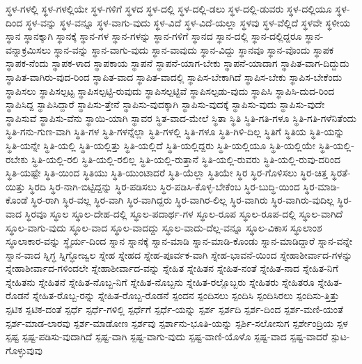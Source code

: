 {ಸ್ಥಳ-ಗಳಲ್ಲಿ
ಸ್ಥಳ-ಗಳಲ್ಲಿಯೇ
ಸ್ಥಳ-ಗಳಿಗೆ
ಸ್ಥಳದ
ಸ್ಥಳ-ದಲ್ಲಿ
ಸ್ಥಳ-ದಲ್ಲಿ-ಡಲು
ಸ್ಥಳ-ದಲ್ಲಿ-ಡುವರು
ಸ್ಥಳ-ದಲ್ಲಿಯೂ
ಸ್ಥಳ-ದಿಂದ
ಸ್ಥಳ-ವನ್ನು
ಸ್ಥಳ-ವನ್ನೂ
ಸ್ಥಳ-ವಾಗು-ವುದು
ಸ್ಥಳ-ವಿದೆ
ಸ್ಥಳ-ವಿದೆ-ಯಲ್ಲಾ
ಸ್ಥಳವು
ಸ್ಥಳ-ವೆಲ್ಲಿದೆ
ಸ್ಥಳವೇ
ಸ್ಥಳೀಯ
ಸ್ಥಾನ
ಸ್ಥಾನಕ್ಕಾಗಿ
ಸ್ಥಾನಕ್ಕೆ
ಸ್ಥಾನ-ಗಳ
ಸ್ಥಾನ-ಗಳನ್ನು
ಸ್ಥಾನ-ಗಳಿಗೆ
ಸ್ಥಾನದ
ಸ್ಥಾನ-ದಲ್ಲಿ
ಸ್ಥಾನ-ದಲ್ಲಿದ್ದರೂ
ಸ್ಥಾನ-ವನ್ನಾಕ್ರಮಿಸಲು
ಸ್ಥಾನ-ವನ್ನು
ಸ್ಥಾನ-ವಾಗು-ವುದು
ಸ್ಥಾನ-ವಾವುದು
ಸ್ಥಾನ-ವಿದ್ದು
ಸ್ಥಾನವೂ
ಸ್ಥಾನ-ವೊಂದು
ಸ್ಥಾಪಕ
ಸ್ಥಾಪಕ-ನೆಂದು
ಸ್ಥಾಪಕ-ಳಾದ
ಸ್ಥಾಪಕಾಯ
ಸ್ಥಾಪನೆ
ಸ್ಥಾಪನೆ-ಯಾಗ-ಬೇಕು
ಸ್ಥಾಪನೆ-ಯಾದಾಗ
ಸ್ಥಾಪಿತ-ವಾಗ-ದಿದ್ದುದು
ಸ್ಥಾಪಿತ-ವಾಗಿರು-ವುದ-ರಿಂದ
ಸ್ಥಾಪಿತ-ವಾದ
ಸ್ಥಾಪಿತ-ವಾದಲ್ಲಿ
ಸ್ಥಾಪಿಸ-ಬೇಕಾಗಿದೆ
ಸ್ಥಾಪಿಸ-ಬೇಕು
ಸ್ಥಾಪಿಸ-ಬೇಕೆಂದು
ಸ್ಥಾಪಿಸಲು
ಸ್ಥಾಪಿಸಲ್ಪಟ್ಟ
ಸ್ಥಾಪಿಸಲ್ಪಟ್ಟಿ-ರುವುದು
ಸ್ಥಾಪಿಸಲ್ಪಟ್ಟಿವೆ
ಸ್ಥಾಪಿಸಲ್ಪಡು-ವುದು
ಸ್ಥಾಪಿಸಿ
ಸ್ಥಾಪಿಸಿ-ದುದ-ರಿಂದ
ಸ್ಥಾಪಿಸಿದ್ದ
ಸ್ಥಾಪಿಸಿದ್ದಾರೆ
ಸ್ಥಾಪಿಸು-ತ್ತೇನೆ
ಸ್ಥಾಪಿಸು-ವುದಕ್ಕಾಗಿ
ಸ್ಥಾಪಿಸು-ವುದಕ್ಕೆ
ಸ್ಥಾಪಿಸು-ವುದು
ಸ್ಥಾಪಿಸು-ವುದೇ
ಸ್ಥಾಪಿಸುವೆ
ಸ್ಥಾಪಿಸು-ವೆನು
ಸ್ಥಾಯಿ-ಯಾಗಿ
ಸ್ಥಾವರ
ಸ್ಥಿತ-ವಾದ-ಮೇಲೆ
ಸ್ಥಿತಾ
ಸ್ಥಿತಿ
ಸ್ಥಿತಿ-ಗತಿ-ಗಳೂ
ಸ್ಥಿತಿ-ಗತಿ-ಗಳೆನಿತೆಂದು
ಸ್ಥಿತಿ-ಗನು-ಗುಣ-ವಾಗಿ
ಸ್ಥಿತಿ-ಗಳ
ಸ್ಥಿತಿ-ಗಳನ್ನೆಲ್ಲಾ
ಸ್ಥಿತಿ-ಗಳಲ್ಲಿ
ಸ್ಥಿತಿ-ಗಳೂ
ಸ್ಥಿತಿ-ಗಿಳಿ-ದಿಲ್ಲ
ಸ್ಥಿತಿಗೆ
ಸ್ಥಿತಿಯ
ಸ್ಥಿತಿ-ಯನ್ನು
ಸ್ಥಿತಿ-ಯನ್ನೇ
ಸ್ಥಿತಿ-ಯಲ್ಲಿ
ಸ್ಥಿತಿ-ಯಲ್ಲಿತ್ತು
ಸ್ಥಿತಿ-ಯಲ್ಲಿದೆ
ಸ್ಥಿತಿ-ಯಲ್ಲಿದ್ದರು
ಸ್ಥಿತಿ-ಯಲ್ಲಿಯೂ
ಸ್ಥಿತಿ-ಯಲ್ಲಿಯೇ
ಸ್ಥಿತಿ-ಯಲ್ಲಿ-ರಬೇಕು
ಸ್ಥಿತಿ-ಯಲ್ಲಿ-ರಲಿ
ಸ್ಥಿತಿ-ಯಲ್ಲಿ-ರಲಿಲ್ಲ
ಸ್ಥಿತಿ-ಯಲ್ಲಿ-ರುತ್ತಾನೆ
ಸ್ಥಿತಿ-ಯಲ್ಲಿ-ರುವರು
ಸ್ಥಿತಿ-ಯಲ್ಲಿ-ರುವು-ದರಿಂದ
ಸ್ಥಿತಿ-ಯಷ್ಟೇ
ಸ್ಥಿತಿ-ಯಿಂದ
ಸ್ಥಿತಿಯು
ಸ್ಥಿತಿ-ಯುಂಟಾದರೆ
ಸ್ಥಿತಿ-ಯೆಲ್ಲಾ
ಸ್ಥಿತಿಯೇ
ಸ್ಥಿರ
ಸ್ಥಿರ-ಗೊಳಿಸಲು
ಸ್ಥಿರ-ಚಿತ್ತ
ಸ್ಥಿರತೆ-ಯಿತ್ತು
ಸ್ಥಿರದಿ
ಸ್ಥಿರ-ನಾಗಿ-ಬಿಟ್ಟಿದ್ದನ್ನು
ಸ್ಥಿರ-ಪಡಿಸಲು
ಸ್ಥಿರ-ಪಡಿಸಿ-ಕೊಳ್ಳ-ಬೇಕೆಂಬ
ಸ್ಥಿರ-ಬುದ್ಧಿ-ಯಿಂದ
ಸ್ಥಿರ-ಮಾಡಿ-ಕೊಂಡೆ
ಸ್ಥಿರ-ರಾಗಿ
ಸ್ಥಿರ-ವಲ್ಲ
ಸ್ಥಿರ-ವಾಗಿ
ಸ್ಥಿರ-ವಾಗಿದ್ದರು
ಸ್ಥಿರ-ವಾಗಿರ-ಲಿಲ್ಲ
ಸ್ಥಿರ-ವಾಗಿರು
ಸ್ಥಿರ-ವಾಗಿರು-ವುದಿಲ್ಲ
ಸ್ಥಿರ-ವಾದ
ಸ್ಥಿರವೂ
ಸ್ಥೂಲ
ಸ್ಥೂಲ-ದೇಹ-ದಲ್ಲಿ
ಸ್ಥೂಲ-ಪದಾರ್ಥ-ಗಳ
ಸ್ಥೂಲ-ರೂಪ
ಸ್ಥೂಲ-ರೂಪ-ದಲ್ಲಿ
ಸ್ಥೂಲ-ವಾಗಿದೆ
ಸ್ಥೂಲ-ವಾಗು-ವುದು
ಸ್ಥೂಲ-ವಾದ
ಸ್ಥೂಲ-ವಾದದ್ದು
ಸ್ಥೂಲ-ವಾದು-ದೆಲ್ಲ-ವನ್ನೂ
ಸ್ಥೂಲ-ವಿಕಾಸ
ಸ್ಥೂಲಾಂಶ
ಸ್ಥೂಲಾಕಾರ-ವನ್ನು
ಸ್ಥೈರ್ಯ-ದಿಂದ
ಸ್ನಾನ
ಸ್ನಾನಕ್ಕೆ
ಸ್ನಾನ-ಮಾಡಿ
ಸ್ನಾನ-ಮಾಡಿ-ಕೊಂಡು
ಸ್ನಾನ-ಮಾಡಿದ್ದಾರೆ
ಸ್ನಾನ-ವನ್ನೇ
ಸ್ನಾನ-ವಾದ
ಸ್ನಿಗ್ಧ
ಸ್ನಿಗ್ಧೋಜ್ವಲ
ಸ್ನೇಹ
ಸ್ನೇಹದ
ಸ್ನೇಹ-ಪೂರ್ವಕ-ವಾಗಿ
ಸ್ನೇಹ-ಭಾವನೆ-ಯಿಂದ
ಸ್ನೇಹಾಶೀರ್ವಾದ-ಗಳನ್ನು
ಸ್ನೇಹಾಶೀರ್ವಾದ-ಗಳಿಂದಲೇ
ಸ್ನೇಹಾಶೀರ್ವಾದ-ವನ್ನು
ಸ್ನೇಹಿತ
ಸ್ನೇಹಿತನ
ಸ್ನೇಹಿತ-ನಂತೆ
ಸ್ನೇಹಿತ-ನಾದ
ಸ್ನೇಹಿತ-ನಿಗೆ
ಸ್ನೇಹಿತನು
ಸ್ನೇಹಿತನೆ
ಸ್ನೇಹಿತ-ನೊಬ್ಬ-ನಿಗೆ
ಸ್ನೇಹಿತ-ನೊಬ್ಬನು
ಸ್ನೇಹಿತ-ರಲ್ಲೊಬ್ಬರು
ಸ್ನೇಹಿತರು
ಸ್ನೇಹಿತರೂ
ಸ್ನೇಹಿತ-ರೊಡನೆ
ಸ್ನೇಹಿತ-ರೊಬ್ಬ-ರನ್ನು
ಸ್ನೇಹಿತ-ರೊಬ್ಬ-ರೊಡನೆ
ಸ್ಪಂದನ
ಸ್ಪಂದಿಸಲು
ಸ್ಪಂದಿಸಿ
ಸ್ಪಂದಿಸಿರಲು
ಸ್ಪಂದಿಸು-ತ್ತಿತ್ತು
ಸ್ಪಟಿಕ
ಸ್ಪಟಿಕ-ದಂತೆ
ಸ್ಪರ್ಧೆ
ಸ್ಪರ್ಧೆ-ಗಳಿಲ್ಲಿ
ಸ್ಪರ್ಧೆಗೆ
ಸ್ಪರ್ಧೆ-ಯನ್ನು
ಸ್ಪರ್ಶ
ಸ್ಪರ್ಶದಿ
ಸ್ಪರ್ಶ-ದಿಂದ
ಸ್ಪರ್ಶ-ಮಣಿ-ಯಂತೆ
ಸ್ಪರ್ಶ-ಮಾಡ-ಲಾರವು
ಸ್ಪರ್ಶ-ಮಾಡೋಣ
ಸ್ಪರ್ಶವು
ಸ್ಪರ್ಶಾನು-ಭೂತಿ-ಯನ್ನು
ಸ್ಪರ್ಶಿ-ಸಲೋಸುಗ
ಸ್ಪರ್ಶೇಂದ್ರಿಯ
ಸ್ಪಳ
ಸ್ಪಷ್ಟ
ಸ್ಪಷ್ಟ-ಪಡಿಸು-ವುದಾಗಿದೆ
ಸ್ಪಷ್ಟ-ವಾಗಿ
ಸ್ಪಷ್ಟ-ವಾಗು-ವುದು
ಸ್ಪಷ್ಟ-ವಾಣಿ-ಯೊಳೊ
ಸ್ಪಷ್ಟ-ವಾದ
ಸ್ಪಷ್ಟ-ವಾದರೆ
ಸ್ಪುಟ-ಗೊಳ್ಳುವುವು
}
